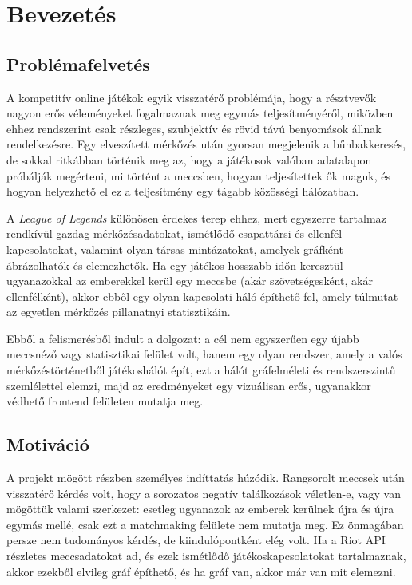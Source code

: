\chapter{Bevezetés}

\section{Problémafelvetés}

A kompetitív online játékok egyik visszatérő problémája, hogy a résztvevők nagyon erős véleményeket fogalmaznak meg egymás teljesítményéről, miközben ehhez rendszerint csak részleges, szubjektív és rövid távú benyomások állnak rendelkezésre. Egy elveszített mérkőzés után gyorsan megjelenik a bűnbakkeresés, de sokkal ritkábban történik meg az, hogy a játékosok valóban adatalapon próbálják megérteni, mi történt a meccsben, hogyan teljesítettek ők maguk, és hogyan helyezhető el ez a teljesítmény egy tágabb közösségi hálózatban.

A \emph{League of Legends} különösen érdekes terep ehhez, mert egyszerre tartalmaz rendkívül gazdag mérkőzésadatokat, ismétlődő csapattársi és ellenfél-kapcsolatokat, valamint olyan társas mintázatokat, amelyek gráfként ábrázolhatók és elemezhetők. Ha egy játékos hosszabb időn keresztül ugyanazokkal az emberekkel kerül egy meccsbe (akár szövetségesként, akár ellenfélként), akkor ebből egy olyan kapcsolati háló építhető fel, amely túlmutat az egyetlen mérkőzés pillanatnyi statisztikáin.

Ebből a felismerésből indult a dolgozat: a cél nem egyszerűen egy újabb meccsnéző vagy statisztikai felület volt, hanem egy olyan rendszer, amely a valós mérkőzéstörténetből játékoshálót épít, ezt a hálót gráfelméleti és rendszerszintű szemlélettel elemzi, majd az eredményeket egy vizuálisan erős, ugyanakkor védhető frontend felületen mutatja meg.

\section{Motiváció}

A projekt mögött részben személyes indíttatás húzódik. Rangsorolt meccsek után visszatérő kérdés volt, hogy a sorozatos negatív találkozások véletlen-e, vagy van mögöttük valami szerkezet: esetleg ugyanazok az emberek kerülnek újra és újra egymás mellé, csak ezt a matchmaking felülete nem mutatja meg. Ez önmagában persze nem tudományos kérdés, de kiindulópontként elég volt. Ha a Riot API részletes meccsadatokat ad, és ezek ismétlődő játékoskapcsolatokat tartalmaznak, akkor ezekből elvileg gráf építhető, és ha gráf van, akkor már van mit elemezni.

